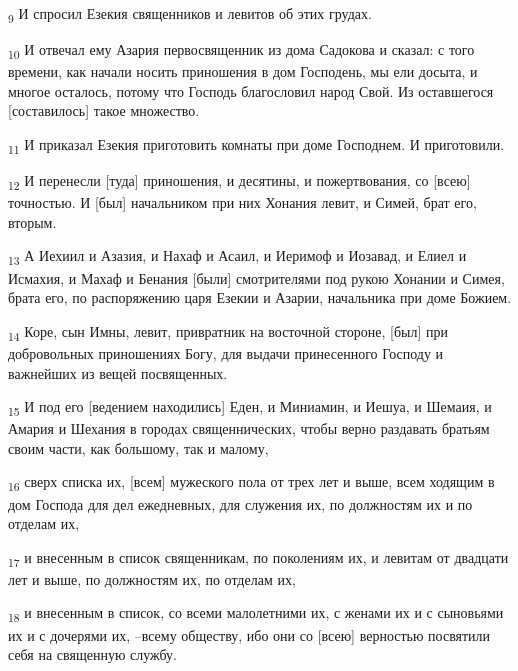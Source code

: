 \begin{tcolorbox}
\textsubscript{9} И спросил Езекия священников и левитов об этих грудах.
\end{tcolorbox}
\begin{tcolorbox}
\textsubscript{10} И отвечал ему Азария первосвященник из дома Садокова и сказал: с того времени, как начали носить приношения в дом Господень, мы ели досыта, и многое осталось, потому что Господь благословил народ Свой. Из оставшегося [составилось] такое множество.
\end{tcolorbox}
\begin{tcolorbox}
\textsubscript{11} И приказал Езекия приготовить комнаты при доме Господнем. И приготовили.
\end{tcolorbox}
\begin{tcolorbox}
\textsubscript{12} И перенесли [туда] приношения, и десятины, и пожертвования, со [всею] точностью. И [был] начальником при них Хонания левит, и Симей, брат его, вторым.
\end{tcolorbox}
\begin{tcolorbox}
\textsubscript{13} А Иехиил и Азазия, и Нахаф и Асаил, и Иеримоф и Иозавад, и Елиел и Исмахия, и Махаф и Бенания [были] смотрителями под рукою Хонании и Симея, брата его, по распоряжению царя Езекии и Азарии, начальника при доме Божием.
\end{tcolorbox}
\begin{tcolorbox}
\textsubscript{14} Коре, сын Имны, левит, привратник на восточной стороне, [был] при добровольных приношениях Богу, для выдачи принесенного Господу и важнейших из вещей посвященных.
\end{tcolorbox}
\begin{tcolorbox}
\textsubscript{15} И под его [ведением находились] Еден, и Миниамин, и Иешуа, и Шемаия, и Амария и Шехания в городах священнических, чтобы верно раздавать братьям своим части, как большому, так и малому,
\end{tcolorbox}
\begin{tcolorbox}
\textsubscript{16} сверх списка их, [всем] мужеского пола от трех лет и выше, всем ходящим в дом Господа для дел ежедневных, для служения их, по должностям их и по отделам их,
\end{tcolorbox}
\begin{tcolorbox}
\textsubscript{17} и внесенным в список священникам, по поколениям их, и левитам от двадцати лет и выше, по должностям их, по отделам их,
\end{tcolorbox}
\begin{tcolorbox}
\textsubscript{18} и внесенным в список, со всеми малолетними их, с женами их и с сыновьями их и с дочерями их, --всему обществу, ибо они со [всею] верностью посвятили себя на священную службу.
\end{tcolorbox}
